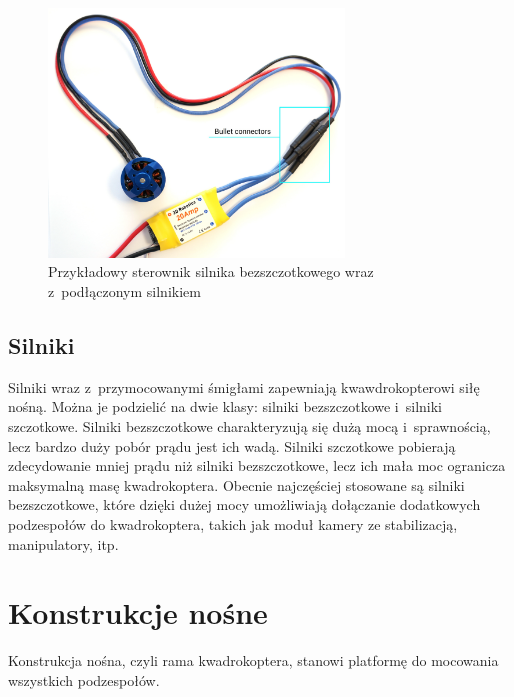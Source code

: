\begin{figure}[H]
	\centering
		\includegraphics[width=0.7\textwidth]{Pictures/esc-motor-connect.jpg}
	\caption[Przykładowy sterownik silnika bezszczotkowego]{Przykładowy sterownik silnika bezszczotkowego wraz z~podłączonym silnikiem~\cite{quadro20}}
	\label{fig:esc-motor-connect.jpg}
\end{figure}


\subsection{Silniki}

Silniki wraz z~przymocowanymi śmigłami zapewniają kwawdrokopterowi siłę nośną. Można je podzielić na dwie klasy: silniki bezszczotkowe i~silniki szczotkowe. Silniki bezszczotkowe charakteryzują się dużą mocą i~sprawnością, lecz bardzo duży pobór prądu jest ich wadą. Silniki szczotkowe pobierają zdecydowanie mniej prądu niż silniki bezszczotkowe, lecz ich mała moc ogranicza maksymalną masę kwadrokoptera. Obecnie najczęściej stosowane są silniki bezszczotkowe, które dzięki dużej mocy umożliwiają dołączanie dodatkowych podzespołów do kwadrokoptera, takich jak moduł kamery ze stabilizacją, manipulatory, itp.


\section{Konstrukcje nośne}

Konstrukcja nośna, czyli rama kwadrokoptera, stanowi platformę do mocowania wszystkich podzespołów. 

